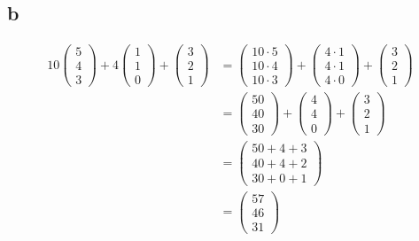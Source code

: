 \subsection{b}
\begin{align*}
    10\begin{pmatrix} 5 \\ 4 \\ 3 \end{pmatrix} + 4 \begin{pmatrix} 1 \\ 1 \\ 0 \end{pmatrix} + \begin{pmatrix} 3 \\ 2 \\ 1 \end{pmatrix}
     & = \begin{pmatrix} 10 \cdot 5 \\ 10 \cdot 4 \\ 10 \cdot 3 \end{pmatrix} + \begin{pmatrix} 4 \cdot 1 \\ 4 \cdot 1 \\ 4 \cdot 0 \end{pmatrix} + \begin{pmatrix} 3 \\ 2 \\ 1 \end{pmatrix} \\
     & = \begin{pmatrix} 50 \\ 40 \\ 30 \end{pmatrix} + \begin{pmatrix} 4 \\ 4 \\ 0 \end{pmatrix} + \begin{pmatrix} 3 \\ 2 \\ 1 \end{pmatrix}                                                 \\
     & = \begin{pmatrix} 50 + 4 + 3 \\ 40 + 4 + 2 \\ 30 + 0 + 1 \end{pmatrix}                                                                                                                 \\
     & = \begin{pmatrix} 57 \\ 46 \\ 31 \end{pmatrix}
\end{align*}

